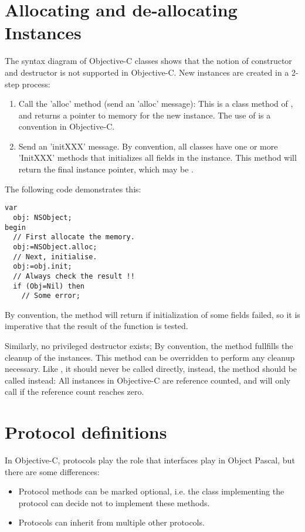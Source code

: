 \section{Allocating and de-allocating Instances}
The syntax diagram of Objective-C classes shows that the notion of
constructor and destructor is not supported in Objective-C. New instances
are created in a 2-step process:
\begin{enumerate}
\item Call the 'alloc' method (send an 'alloc' message): This is a class method
of , and returns a pointer to memory for the new instance.
The use of  is a convention in Objective-C.
\item Send an 'initXXX' message. By convention, all classes have one or more
'InitXXX' methods that initializes all fields in the instance. This method
will return the final instance pointer, which may be .
\end{enumerate}
The following code demonstrates this:
\begin{verbatim}
var
  obj: NSObject;
begin
  // First allocate the memory.
  obj:=NSObject.alloc;
  // Next, initialise.
  obj:=obj.init;
  // Always check the result !!
  if (Obj=Nil) then
    // Some error;
\end{verbatim}
By convention, the  method will return  if
initialization of some fields failed, so it is imperative that the result of
the function is tested.

Similarly, no privileged destructor exists; By convention, the  method
fullfills the cleanup of the instances. This method can be overridden to
perform any cleanup necessary. Like , it should never be called directly,
instead, the  method should be called instead: All instances in
Objective-C are reference counted, and  will only call
 if the reference count reaches zero.

\section{Protocol definitions}
In Objective-C, protocols play the role that interfaces play in Object
Pascal, but there are some differences:
\begin{itemize}
\item Protocol methods can be marked optional, i.e. the class implementing
the protocol can decide not to implement these methods.
\item Protocols can inherit from multiple  other protocols.
\end{itemize}


